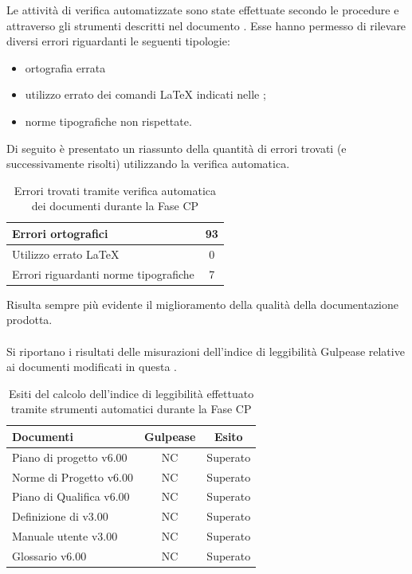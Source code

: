 Le attività di verifica automatizzate sono state effettuate secondo le procedure e attraverso gli strumenti descritti nel documento . Esse hanno permesso di rilevare diversi errori riguardanti le seguenti tipologie:
\begin{itemize}
\item ortografia errata
\item utilizzo errato dei comandi \LaTeX{} indicati nelle ;
\item norme tipografiche non rispettate.
\end{itemize}
Di seguito è presentato un riassunto della quantità di errori trovati (e successivamente risolti) utilizzando la verifica automatica.
\begin{table}[H]
	\centering
		\begin{tabu}{| l | c |}
			\hline
			Errori ortografici	& 93	\\ \hline
			Utilizzo errato \LaTeX{}	& 0	\\ \hline
			Errori riguardanti norme tipografiche	& 7	\\ \hline
		\end{tabu}
	\caption{Errori trovati tramite verifica automatica dei documenti durante la Fase CP}
\end{table}

Risulta sempre più evidente il miglioramento della qualità della documentazione prodotta.\\ \\
Si riportano i risultati delle misurazioni dell'indice di leggibilità Gulpease relative ai documenti modificati in questa .


\begin{table}[H]
	\centering
		\begin{tabu}{| l | c | c |}
			\hline
			Documenti 							& Gulpease	& Esito		\\ \hline \hline
			Piano di progetto v6.00				& NC 		& Superato  \\ \hline
			Norme di Progetto v6.00 			& NC		& Superato  \\ \hline
			Piano di Qualifica v6.00 			& NC		& Superato  \\ \hline
			Definizione di  v3.00		& NC		& Superato \\ \hline
			Manuale utente v3.00				& NC		& Superato \\ \hline
			Glossario v6.00					 	& NC 		& Superato  \\ \hline
		\end{tabu}
	\caption{Esiti del calcolo dell'indice di leggibilità effettuato tramite strumenti automatici durante la Fase CP}
\end{table}

